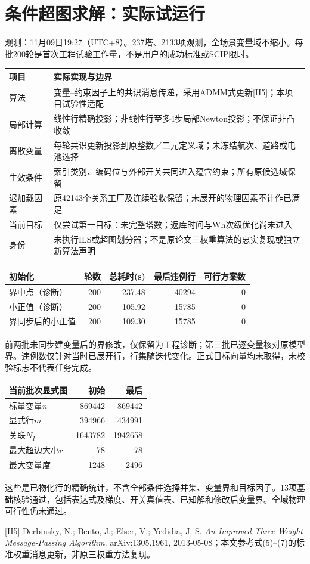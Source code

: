 \section*{条件超图求解：实际试运行}
\noindent 观测：11月09日19:27（UTC+8）。237塔、2133项观测，全场景变量域不缩小。每批200轮是首次工程试验工作量，不是用户的成功标准或SCIP限时。
\begin{center}\small
\begin{tabular}{p{35mm}p{110mm}}\toprule
项目 & 实际实现与边界\\\midrule
算法 & 变量--约束因子上的共识消息传递，采用ADMM式更新[H5]；本项目试验性适配\\
局部计算 & 线性行精确投影；非线性行至多4步局部Newton投影；不保证非凸收敛\\
离散变量 & 每轮共识更新投影到原整数／二元定义域；未冻结航次、道路或电池选择\\
生效条件 & 索引类别、编码位与外部开关共同进入蕴含约束；所有原候选域保留\\
迟加载因素 & 原42143个关系工厂及连续验收保留；未展开的物理因素不计作已满足\\
当前目标 & 仅尝试第一目标：未完整塔数；返库时间与Wh次级优化尚未进入\\
身份 & 未执行ILS或超图划分器；不是原论文三权重算法的忠实复现或独立新算法声明\\\bottomrule
\end{tabular}\end{center}
\begin{center}\small
\begin{tabular}{p{37mm}rrrr}\toprule
初始化 & 轮数 & 总耗时(s) & 最后违例行 & 可行方案数\\\midrule
界中点（诊断） & 200 & 237.48 & 40294 & 0\\
小正值（诊断） & 200 & 105.92 & 15785 & 0\\
界同步后的小正值 & 200 & 109.30 & 15785 & 0\\
\bottomrule\end{tabular}\end{center}
\noindent 前两批未同步建变量后的界修改，仅保留为工程诊断；第三批已逐变量核对原模型界。违例数仅针对当时已展开行，行集随迭代变化。正式目标向量均未取得，未校验标志不代表任务完成。
\begin{center}\small
\begin{tabular}{p{55mm}rr}\toprule
当前批次显式图 & 初始 & 最后\\\midrule
标量变量$n$ & 869442 & 869442\\
显式行$m$ & 394966 & 434991\\
关联$N_I$ & 1643782 & 1942658\\
最大超边大小$r$ & 78 & 78\\
最大变量度 & 1248 & 2496\\\bottomrule
\end{tabular}\end{center}
\noindent 这些是已物化行的精确统计，不含全部条件选择并集、变量界和目标因子。13项基础核验通过，包括表达式及梯度、开关真值表、已知解和修改后变量界。全域物理可行性仍未通过。

\footnotesize [H5] Derbinsky, N.; Bento, J.; Elser, V.; Yedidia, J. S. \emph{An Improved Three-Weight Message-Passing Algorithm}. arXiv:1305.1961, 2013-05-08；本文参考式(5)--(7)的标准权重消息更新，非原三权重方法复现。\par\endgroup
